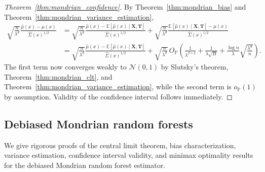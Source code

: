 \documentclass[11pt,lof]{puthesis}
\renewcommand{\P}{\ensuremath{\mathbb{P}}}
\newcommand{\E}{\ensuremath{\mathbb{E}}}
\newcommand{\bX}{\ensuremath{\mathbf{X}}}
\newcommand{\bT}{\ensuremath{\mathbf{T}}}
\newcommand{\cN}{\ensuremath{\mathcal{N}}}
\theoremstyle{break}
\theoremstyle{proof}
\newtheorem{proof}{Proof}
\begin{document}
\begin{proof}[Theorem~\ref{thm:mondrian_confidence}]
%
By Theorem~\ref{thm:mondrian_bias}
and Theorem~\ref{thm:mondrian_variance_estimation},
%
\begin{align*}
\sqrt{\frac{n}{\lambda^d}}
\frac{\hat \mu(x) - \mu(x)}{\hat \Sigma(x)^{1/2}}
&=
\sqrt{\frac{n}{\lambda^d}}
\frac{\hat \mu(x) - \E \left[ \hat \mu(x) \mid \bX, \bT \right]}
{\hat \Sigma(x)^{1/2}}
+ \sqrt{\frac{n}{\lambda^d}}
\frac{\E \left[ \hat \mu(x) \mid \bX, \bT \right] - \mu(x)}
{\hat \Sigma(x)^{1/2}} \\
&=
\sqrt{\frac{n}{\lambda^d}}
\frac{\hat \mu(x) - \E \left[ \hat \mu(x) \mid \bX, \bT \right]}
{\hat \Sigma(x)^{1/2}}
+ \sqrt{\frac{n}{\lambda^d}} \,
O_\P \left(
\frac{1}{\lambda^{\beta \wedge 2}}
+ \frac{1}{\lambda \sqrt B}
+ \frac{\log n}{\lambda} \sqrt{\frac{\lambda^d}{n}}
\right).
\end{align*}
%
The first term now converges weakly to $\cN(0,1)$ by
Slutsky's theorem, Theorem~\ref{thm:mondrian_clt},
and Theorem~\ref{thm:mondrian_variance_estimation},
while the second term is $o_\P(1)$ by assumption.
Validity of the confidence interval follows immediately.
%
\end{proof}

\subsection{Debiased Mondrian random forests}

We give rigorous proofs of the central limit theorem,
bias characterization, variance estimation,
confidence interval validity, and minimax optimality
results for the debiased Mondrian random forest estimator.
\end{document}
